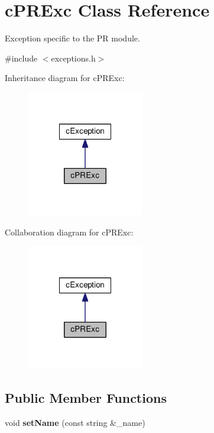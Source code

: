 \hypertarget{classcPRExc}{\section{c\-P\-R\-Exc \-Class \-Reference}
\label{d5/d34/classcPRExc}
}


\-Exception specific to the \-P\-R module.  




{\ttfamily \#include $<$exceptions.\-h$>$}



\-Inheritance diagram for c\-P\-R\-Exc\-:\nopagebreak
\begin{figure}[H]
\begin{center}
\leavevmode
\includegraphics[width=144pt]{d0/da7/classcPRExc__inherit__graph}
\end{center}
\end{figure}


\-Collaboration diagram for c\-P\-R\-Exc\-:\nopagebreak
\begin{figure}[H]
\begin{center}
\leavevmode
\includegraphics[width=144pt]{de/d3b/classcPRExc__coll__graph}
\end{center}
\end{figure}
\subsection*{\-Public \-Member \-Functions}
\begin{DoxyCompactItemize}
\item 
\hypertarget{classcPRExc_a24b4994c84da2efc6fa6652d15809e14}{void {\bfseries set\-Name} (const string \&\-\_\-name)}\label{d5/d34/classcPRExc_a24b4994c84da2efc6fa6652d15809e14}

\end{DoxyCompactItemize}
